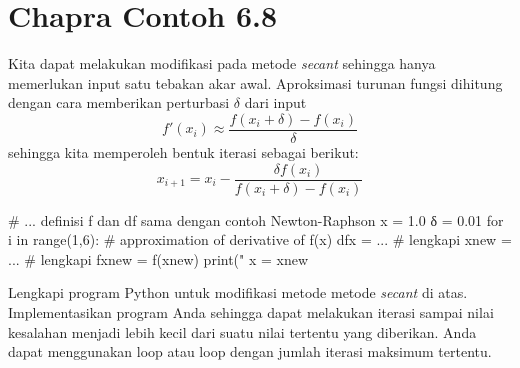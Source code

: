 \section{Chapra Contoh 6.8}

Kita dapat melakukan modifikasi pada metode \textit{secant} sehingga hanya
memerlukan input satu tebakan akar awal. Aproksimasi turunan fungsi
dihitung dengan cara memberikan perturbasi $\delta$ dari input
\begin{equation*}
f'(x_{i}) \approx \frac{f(x_{i}+\delta) - f(x_{i})}{\delta}
\end{equation*}
sehingga kita memperoleh bentuk iterasi sebagai berikut:
\begin{equation}
x_{i+1} = x_{i} - \frac{\delta f(x_{i})}{f(x_{i}+\delta) - f(x_{i})}
\end{equation}

\begin{pythoncode}
# ... definisi f dan df sama dengan contoh Newton-Raphson
x = 1.0
δ = 0.01
for i in range(1,6):
    # approximation of derivative of f(x)
    dfx = ... # lengkapi
    xnew = ... # lengkapi
    fxnew = f(xnew)
    print("%
    x = xnew    
\end{pythoncode}

\begin{soal}
Lengkapi program Python untuk modifikasi metode metode \textit{secant} di atas.
Implementasikan program Anda sehingga
dapat melakukan iterasi sampai nilai kesalahan menjadi lebih kecil dari
suatu nilai tertentu yang diberikan. Anda dapat menggunakan loop 
atau loop  dengan jumlah iterasi maksimum tertentu.
\end{soal}